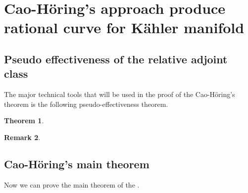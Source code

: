 \documentclass[11pt]{article}
\theoremstyle{definition}
\newtheorem{theorem}{Theorem}
\newtheorem{remark}[theorem]{Remark}
\begin{document}
	
	\section{Cao-H\"oring's approach produce rational curve for K\"ahler manifold}
	\subsection{Pseudo effectiveness of the relative adjoint class}
	The major technical tools that will be used in the proof of the Cao-H\"oring's theorem is the following pseudo-effectiveness theorem. 
	
	\begin{theorem}
		
	\end{theorem}
	\begin{remark}
		
	\end{remark}
	
	\subsection{Cao-H\"oring's main theorem}
	Now we can prove the main theorem of the \cite{CH20}.
	
	
	
	
	
	
\end{document}
